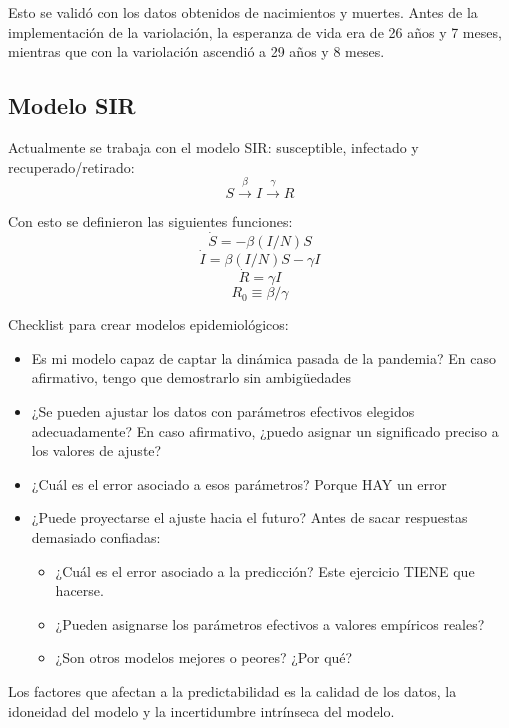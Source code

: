 \documentclass[nochap]{config/ejercicios}
\begin{document}
Esto se validó con los datos obtenidos de nacimientos y muertes. Antes de la implementación de la variolación, la esperanza de vida era de 26 años y 7 meses, mientras que con la variolación ascendió a 29 años y 8 meses.

\subsection{Modelo SIR}
Actualmente se trabaja con el modelo SIR: susceptible, infectado y recuperado/retirado:
$$S \xrightarrow{\beta} I \xrightarrow{\gamma} R$$

Con esto se definieron las siguientes funciones:
$$\dot{S} = - \beta (I/N) S$$
$$\dot{I} = \beta (I/N) S - \gamma I $$
$$\dot{R} = \gamma I$$
$$R_0 \equiv \beta / \gamma$$

Checklist para crear modelos epidemiológicos:
\begin{itemize}
\item Es mi modelo capaz de captar la dinámica pasada de la pandemia? En caso afirmativo, tengo que demostrarlo sin ambigüedades
\item ¿Se pueden ajustar los datos con parámetros efectivos elegidos adecuadamente?
En caso afirmativo, ¿puedo asignar un significado preciso a los valores de ajuste?
\item ¿Cuál es el error asociado a esos parámetros? Porque HAY un error
\item ¿Puede proyectarse el ajuste hacia el futuro? Antes de sacar respuestas demasiado confiadas:
\begin{itemize}
\item ¿Cuál es el error asociado a la predicción? Este ejercicio TIENE que hacerse.
\item ¿Pueden asignarse los parámetros efectivos a valores empíricos reales?
\item ¿Son otros modelos mejores o peores? ¿Por qué?
\end{itemize}
\end{itemize}

Los factores que afectan a la predictabilidad es la calidad de los datos, la idoneidad del modelo y la incertidumbre intrínseca del modelo.
\end{document}
